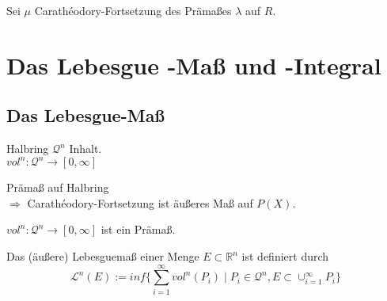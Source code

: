 \documentclass[11pt]{memoir}
\newcommand{\cara}{Carathéodory-Fortsetzung}
\begin{document}
\begin{Satz}
Sei $\mu$ \cara{} des Prämaßes $\lambda$ auf $R$.
\end{Satz}

\chapter{Das Lebesgue -Maß und -Integral}
\section{Das Lebesgue-Maß}

Halbring $\mathcal{Q}^n$ Inhalt.\\
$vol^n : \mathcal{Q}^n \rightarrow [0, \infty]$

\begin{Satz}
	Prämaß auf Halbring\\
	$\Rightarrow$ \cara{} ist äußeres Maß auf $P(X)$.
\end{Satz}

\begin{Lemma}
	$vol^n : \mathcal{Q}^n \rightarrow [0, \infty]$ ist ein Prämaß.
\end{Lemma}

\begin{Definition}
	Das (äußere) Lebesguemaß einer Menge $E \subset \mathbb{R}^n$ ist definiert durch\\
	$$ \mathscr{L}^n(E) := inf\{ \sum_{i = 1}^{\infty} vol^n(P_i) \mid P_i \in \mathscr{Q}^n, E \subset \cup_{i = 1}^{\infty} P_i \} $$
\end{Definition}
\end{document}
